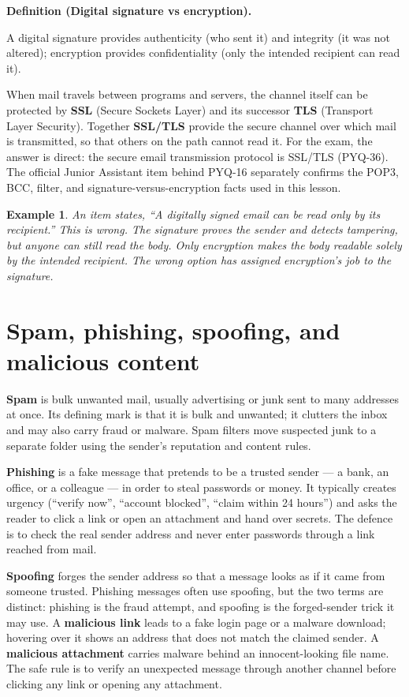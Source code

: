 \documentclass[11pt]{article}
\newtheorem{example}{Example}[section]
\newenvironment{definitionbox}[1]{%
  \par\noindent\textbf{Definition (#1).}\ \itshape
}{\par\vspace{0.3em}}
\begin{document}
\begin{definitionbox}{Digital signature vs encryption}
A digital signature provides authenticity (who sent it) and integrity (it
was not altered); encryption provides confidentiality (only the intended
recipient can read it).
\end{definitionbox}

When mail travels between programs and servers, the channel itself can be
protected by \textbf{SSL} (Secure Sockets Layer) and its successor
\textbf{TLS} (Transport Layer Security). Together \textbf{SSL/TLS} provide
the secure channel over which mail is transmitted, so that others on the
path cannot read it. For the exam, the answer is direct: the secure email
transmission protocol is SSL/TLS (PYQ-36). The official Junior Assistant
item behind PYQ-16 separately confirms the POP3, BCC, filter, and
signature-versus-encryption facts used in this lesson.

\begin{example}
An item states, ``A digitally signed email can be read only by its
recipient.'' This is wrong. The signature proves the sender and detects
tampering, but anyone can still read the body. Only encryption makes the
body readable solely by the intended recipient. The wrong option has
assigned encryption's job to the signature.
\end{example}

\section{Spam, phishing, spoofing, and malicious content}
\textbf{Spam} is bulk unwanted mail, usually advertising or junk sent to
many addresses at once. Its defining mark is that it is bulk and unwanted;
it clutters the inbox and may also carry fraud or malware. Spam filters move
suspected junk to a separate folder using the sender's reputation and
content rules.

\textbf{Phishing} is a fake message that pretends to be a trusted sender
--- a bank, an office, or a colleague --- in order to steal passwords or
money. It typically creates urgency (``verify now'', ``account blocked'',
``claim within 24 hours'') and asks the reader to click a link or open an
attachment and hand over secrets. The defence is to check the real sender
address and never enter passwords through a link reached from mail.

\textbf{Spoofing} forges the sender address so that a message looks as if
it came from someone trusted. Phishing messages often use spoofing, but
the two terms are distinct: phishing is the fraud attempt, and spoofing is
the forged-sender trick it may use. A \textbf{malicious link} leads to a
fake login page or a malware download; hovering over it shows an address
that does not match the claimed sender. A \textbf{malicious attachment}
carries malware behind an innocent-looking file name. The safe rule is to
verify an unexpected message through another channel before clicking any
link or opening any attachment.
\end{document}
